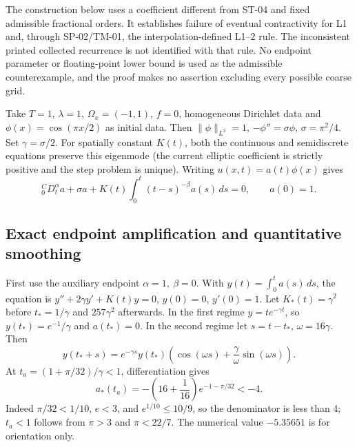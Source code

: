 \documentclass[11pt,a4paper]{amsart}
\theoremstyle{remark}
\theoremstyle{plain}
\theoremstyle{remark}
\numberwithin{equation}{section}
\begin{document}
The construction below uses a coefficient different from ST-04 and fixed admissible fractional orders. It establishes failure of eventual contractivity for L1 and, through SP-02/TM-01, the interpolation-defined L1--2 rule. The inconsistent printed collected recurrence is not identified with that rule. No endpoint parameter or floating-point lower bound is used as the admissible counterexample, and the proof makes no assertion excluding every possible coarse grid.

Take $T=1$, $\lambda=1$, $\Omega_x=(-1,1)$, $f=0$, homogeneous Dirichlet data and $\phi(x)=\cos(\pi x/2)$ as initial data. Then $\|\phi\|_{L^2}=1$, $-\phi''=\sigma\phi$, $\sigma=\pi^2/4$. Set $\gamma=\sigma/2$. For spatially constant $K(t)$, both the continuous and semidiscrete equations preserve this eigenmode (the current elliptic coefficient is strictly positive and the step problem is unique). Writing $u(x,t)=a(t)\phi(x)$ gives
\begin{equation}\label{eq:st05-scalar}
 {}_0^CD_t^\alpha a+\sigma a+K(t)\int_0^t(t-s)^{-\beta}a(s)\,ds=0,\qquad a(0)=1.
\end{equation}

\subsection{Exact endpoint amplification and quantitative smoothing}
First use the auxiliary endpoint $\alpha=1,\ \beta=0$. With $y(t)=\int_0^t a(s)\,ds$, the equation is $y''+2\gamma y'+K(t)y=0$, $y(0)=0$, $y'(0)=1$. Let $K_*(t)=\gamma^2$ before $t_*=1/\gamma$ and $257\gamma^2$ afterwards. In the first regime $y=te^{-\gamma t}$, so $y(t_*)=e^{-1}/\gamma$ and $a(t_*)=0$. In the second regime let $s=t-t_*$, $\omega=16\gamma$. Then
\[
 y(t_*+s)=e^{-\gamma s}y(t_*)\left(\cos(\omega s)+\frac{\gamma}{\omega}\sin(\omega s)\right).
\]
At $t_a=(1+\pi/32)/\gamma<1$, differentiation gives
\begin{equation}\label{eq:st05-endpoint}
 a_*(t_a)=-\left(16+\frac1{16}\right)e^{-1-\pi/32}<-4.
\end{equation}
Indeed $\pi/32<1/10$, $e<3$, and $e^{1/10}\le 10/9$, so the denominator is less than 4; $t_a<1$ follows from $\pi>3$ and $\pi<22/7$. The numerical value $-5.35651$ is for orientation only.
\end{document}

